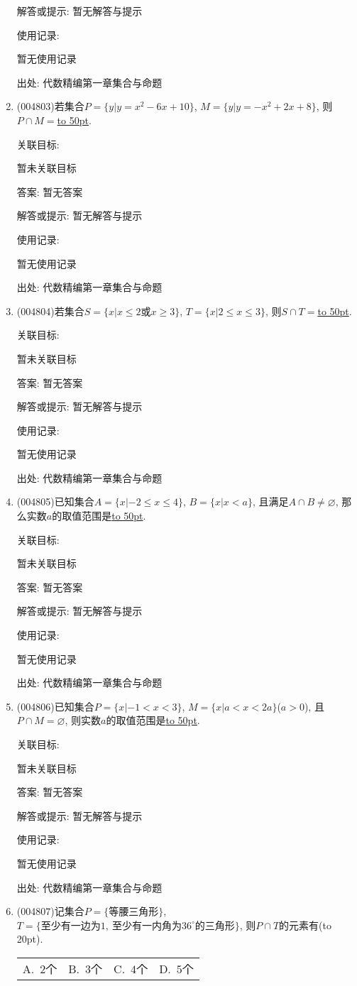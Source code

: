 \documentclass[10pt,a4paper]{article}
\newcommand{\blank}[1]{\underline{\hbox to #1pt{}}}
\newcommand{\bracket}[1]{(\hbox to #1pt{})}
\newcommand{\fourch}[4]{\par\begin{tabular}{p{.23\textwidth}p{.23\textwidth}p{.23\textwidth}p{.23\textwidth}}
A.~#1 &B.~#2& C.~#3& D.~#4
\end{tabular}}
\begin{document}
\begin{enumerate}[1.]
解答或提示: 暂无解答与提示

使用记录:

暂无使用记录


出处: 代数精编第一章集合与命题
\item { (004803)}若集合$P=\{y|y=x^2-6x+10\}$, $M=\{y|y=-x^2+2x+8\}$, 则$P\cap M=$\blank{50}.


关联目标:

暂未关联目标

答案: 暂无答案

解答或提示: 暂无解答与提示

使用记录:

暂无使用记录


出处: 代数精编第一章集合与命题
\item { (004804)}若集合$S=\{x|x\le 2\text{或}x\ge 3\}$, $T=\{x|2\le x\le 3\}$, 则$S\cap T=$\blank{50}.


关联目标:

暂未关联目标

答案: 暂无答案

解答或提示: 暂无解答与提示

使用记录:

暂无使用记录


出处: 代数精编第一章集合与命题
\item { (004805)}已知集合$A=\{x|-2\le x\le 4\}$, $B=\{x|x<a\}$, 且满足$A\cap B\ne \varnothing$, 那么实数$a$的取值范围是\blank{50}.


关联目标:

暂未关联目标

答案: 暂无答案

解答或提示: 暂无解答与提示

使用记录:

暂无使用记录


出处: 代数精编第一章集合与命题
\item { (004806)}已知集合$P=\{x|-1<x<3\}$, $M=\{x|a<x<2a\}$($a>0$), 且$P\cap M=\varnothing$, 则实数$a$的取值范围是\blank{50}.


关联目标:

暂未关联目标

答案: 暂无答案

解答或提示: 暂无解答与提示

使用记录:

暂无使用记录


出处: 代数精编第一章集合与命题
\item { (004807)}记集合$P=\{\text{等腰三角形}\}$, $T=\{\text{至少有一边为}1, \ \text{至少有一内角为}36^\circ\text{的三角形}\}$, 则$P\cap T$的元素有\bracket{20}.
\fourch{$2$个}{$3$个}{$4$个}{$5$个}



\end{enumerate}
\end{document}
